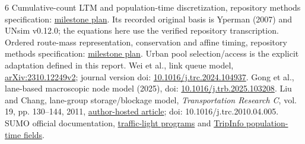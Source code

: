 \documentclass[10pt,a4paper]{article}
\newcommand{\head}[1]{\par\vspace{4pt}\noindent\textbf{#1}\par\nobreak\vspace{1pt}}
\begin{document}
\makeatletter
\renewcommand{\section}{\@ifstar{\head}{\head}}
\makeatother
\begin{thebibliography}{6}
\setlength{\itemsep}{0pt}\setlength{\parskip}{0pt}
 Cumulative-count LTM and population-time discretization,
repository methods specification:
\href{../../../../docs/milestones/milestone_0_ltm_baseline.md}{milestone plan}.
Its recorded original basis is Yperman (2007) and UNsim v0.12.0;
the equations here use the verified repository transcription.
 Ordered route-mass representation, conservation and affine timing,
repository methods specification:
\href{../../../../docs/milestones/milestone_1_ordered_route_mass_ledger.md}
{milestone plan}. Urban pool selection/access is the explicit adaptation
defined in this report.
 Wei et al., link queue model,
\href{https://arxiv.org/html/2310.12249v2}{arXiv:2310.12249v2};
journal version doi:
\href{https://doi.org/10.1016/j.trc.2024.104937}{10.1016/j.trc.2024.104937}.
 Gong et al., lane-based macroscopic node model (2025),
doi: \href{https://doi.org/10.1016/j.trb.2025.103208}
{10.1016/j.trb.2025.103208}.
 Liu and Chang, lane-group storage/blockage model,
\emph{Transportation Research C}, vol. 19, pp. 130--144, 2011,
\href{https://attap.umd.edu/wp-content/uploads/2022/05/TRC522.pdf}
{author-hosted article}; doi: 10.1016/j.trc.2010.04.005.
 SUMO official documentation,
\href{https://sumo.dlr.de/docs/Simulation/Traffic_Lights.html}
{traffic-light programs} and
\href{https://sumo.dlr.de/docs/Simulation/Output/TripInfo.html}
{TripInfo population-time fields}.
\end{thebibliography}
\end{document}

